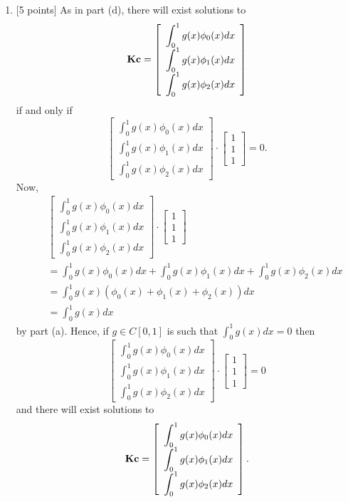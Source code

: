 \begin{solution}
\begin{enumerate}
\item {[5 points]} As in part (d), there will exist solutions to
\[
{\bf K}{\bf c}=\left[\begin{array}{c}\displaystyle{\int_0^1g(x)\phi_0(x)dx} \\ \displaystyle{\int_0^1g(x)\phi_1(x)dx} \\ \displaystyle{\int_0^1g(x)\phi_2(x)dx}\end{array}\right]
\]
if and only if
\[
\left[\begin{array}{c}\displaystyle{\int_0^1g(x)\phi_0(x)dx} \\ \displaystyle{\int_0^1g(x)\phi_1(x)dx} \\ \displaystyle{\int_0^1g(x)\phi_2(x)dx}\end{array}\right]\cdot\left[\begin{array}{c}1 \\ 1 \\ 1\end{array}\right]=0.
\]
Now,
\begin{eqnarray*}
&&\left[\begin{array}{c}\displaystyle{\int_0^1g(x)\phi_0(x)dx} \\ \displaystyle{\int_0^1g(x)\phi_1(x)dx} \\ \displaystyle{\int_0^1g(x)\phi_2(x)dx}\end{array}\right]\cdot\left[\begin{array}{c}1 \\ 1 \\ 1\end{array}\right]
\\
&&=\displaystyle{\int_0^1g(x)\phi_0(x)dx+\int_0^1g(x)\phi_1(x)dx+\int_0^1g(x)\phi_2(x)dx}
\\
&&=\displaystyle{\int_0^1g(x)\left(\phi_0(x)+\phi_1(x)+\phi_2(x)\right)dx}
\\
&&=\displaystyle{\int_0^1g(x)dx}
\end{eqnarray*}
by part (a). Hence, if $g\in C[0,1]$ is such that $\displaystyle{\int_0^1g(x)dx=0}$ then
\[
\left[\begin{array}{c}\displaystyle{\int_0^1g(x)\phi_0(x)dx} \\ \displaystyle{\int_0^1g(x)\phi_1(x)dx} \\ \displaystyle{\int_0^1g(x)\phi_2(x)dx}\end{array}\right]\cdot\left[\begin{array}{c}1 \\ 1 \\ 1\end{array}\right]=0
\]
and there will exist solutions to
\[
{\bf K}{\bf c}=\left[\begin{array}{c}\displaystyle{\int_0^1g(x)\phi_0(x)dx} \\ \displaystyle{\int_0^1g(x)\phi_1(x)dx} \\ \displaystyle{\int_0^1g(x)\phi_2(x)dx}\end{array}\right].
\]

\end{enumerate} 
\end{solution}